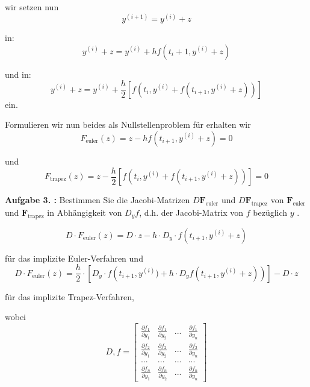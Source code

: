 wir setzen nun
\begin{equation}
	 y^{(i+1)} = y^{(i)} + z 
\end{equation}


in:
\begin{equation}
	 y^{(i)}+ z = y^{(i)} + hf\left(t_i+1,y^{(i)} + z\right) 
\end{equation}



und in:
\begin{equation}
	 y^{(i)} + z = y^{(i)} + \frac{h}{2} \left[f\left(t_i, y^{(i)} + f\left(t_{i+1},y^{(i)} + z\right)\right)\right] 
\end{equation}
ein.

Formulieren wir nun beides als Nullstellenproblem für  erhalten wir
\begin{equation}
	 F_{\mathrm{euler}}(z) = z - hf(t_{i+1}, y^{(i)} + z) = 0 
\end{equation}

und 
\begin{equation}
F_{\mathrm{trapez}}(z) =  z - \frac{h}{2} \left[f\left(t_i, y^{(i)} + f(t _{i+1},y^{(i)} + z)\right)\right] = 0
\end{equation}

\begin{mybox}
\textbf{Aufgabe 3. :}
Bestimmen Sie die Jacobi-Matrizen $D\textbf{F}_{\mathrm{euler}}$ und $D\textbf{F}_{\mathrm{trapez}}$ von $\textbf{F}_{\mathrm{euler}}$  und $\textbf{F}_{\mathrm{trapez}}$  in Abhängigkeit von $D_yf$, d.h. der Jacobi-Matrix von $f$ bezüglich $y$ .
\end{mybox}

\begin{equation}
	 D\cdot F_{\mathrm{euler}}(z) = D\cdot z - h\cdot D_y\cdot f\left(t_{i+1}, y^{(i)} + z\right) 
\end{equation}


für das implizite Euler-Verfahren und
\begin{equation}
	 D\cdot F_{\mathrm{euler}}(z) = \frac{h}{2}\cdot \left[D_{y}\cdot f\left(t_{i+1}, y^{(i)}) +  h\cdot D_y f(t_{i+1}, y^{(i)} + z)\right)\right] - D\cdot z 
\end{equation}


für das implizite Trapez-Verfahren,

wobei 
\begin{equation}
	D, f =
\begin{bmatrix}
	\frac{\partial f_1 }{\partial y_1} & \frac{\partial f_1 }{\partial y_2} & ... & \frac{\partial f_1 }{\partial y_n} \\
	\frac{\partial f_2 }{\partial y_1} & \frac{\partial f_2 }{\partial y_2} & ... & \frac{\partial f_2 }{\partial y_n} \\
	... & ... & ... & ... \\
	\frac{\partial f_n }{\partial y_1} & \frac{\partial f_n }{\partial y_2} & ... & \frac{\partial f_n }{\partial y_n} 
\end{bmatrix} 
\end{equation}


